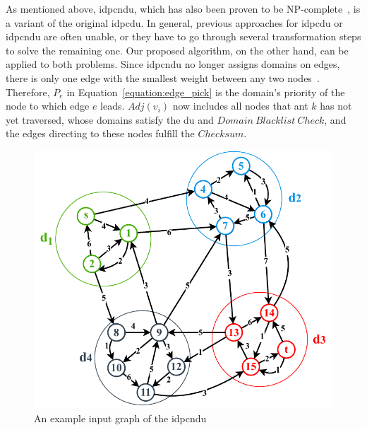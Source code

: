 As mentioned above, \acrshort{idpcndu}, which has also been proven to be NP-complete~\cite{maggi2018domain}, is a variant of the original \gls{idpcdu}. In general, previous approaches for \gls{idpcdu} or \acrshort{idpcndu} are often unable, or they have to go through several transformation steps to solve the remaining one. Our proposed algorithm, on the other hand, can be applied to both problems. Since \acrshort{idpcndu} no longer assigns domains on edges, there is only one edge with the smallest weight between any two nodes~\cite{binh2021two}. Therefore, $P_e$ in Equation~\ref{equation:edge_pick} is the domain's priority of the node to which edge $e$ leads. $Adj(v_i)$ now includes all nodes that ant $k$ has not yet traversed, whose domains satisfy the \gls{du} and $Domain~Blacklist~Check$, and the edges directing to these nodes fulfill the $Checksum$.

\setlength{\intextsep}{3pt}
\renewcommand{\scalefigure}{.9}
\begin{figure}[htbp]
	\centering
	\includegraphics[scale=\scalefigure]{Figures/chap 3/IDPC-NDU.pdf}
	\caption{An example input graph of the \gls{idpcndu}}
	\label{fig:idpc-ndu-example}
\end{figure}